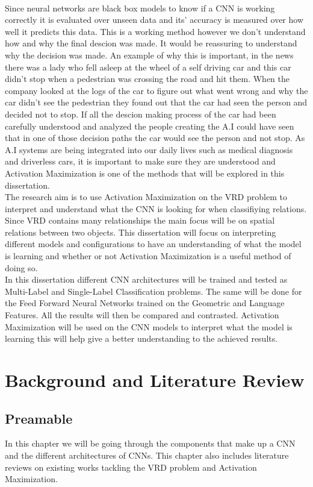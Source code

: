 \documentclass{csfyp}
\newcommand\tab[1][1cm]{\hspace*{#1}}
\begin{document}
\\
\tab
Since neural networks are black box models to know if a CNN is working correctly it is evaluated over unseen data and its’ accuracy is measured over how well it predicts this data. This is a working method however we don't understand how and why the final descion was made. It would be reassuring to understand why the decision was made. An example of why this is important, in the news there was a lady who fell asleep at the wheel of a self driving car and this car didn’t stop when a pedestrian was crossing the road and hit them. When the company looked at the logs of the car to figure out what went wrong and why the car didn’t see the pedestrian they found out that the car had seen the person and decided not to stop. If all the descion making process of the car had been carefully understood and analyzed the people creating the A.I could have seen that in one of those decision paths the car would see the person and not stop. As A.I systems are being integrated into our daily lives such as medical diagnosis and driverless cars, it is important to make sure they are understood and Activation Maximization is one of the methods that will be explored in this dissertation.
\\
\tab
The research aim is to use Activation Maximization on the VRD problem to interpret and understand what the CNN is looking for when classifiying relations. Since VRD contains many relationships the main focus will be on spatial relations between two objects. This dissertation will focus on interpreting different models and configurations to have an understanding of what the model is learning and whether or not Activation Maximization is a useful method of doing so.
\\
\tab In this dissertation different CNN architectures will be trained and tested as Multi-Label and Single-Label Classification problems. The same will be done for the Feed Forward Neural Networks trained on the Geometric and Language Features. All the results will then be compared and contrasted. Activation Maximization will be used on the CNN models to interpret what the model is learning this will help give a better understanding to the achieved results.

\section{Background and Literature Review}
\subsection{Preamable}
In this chapter we will be going through the components that make up a CNN and the different architectures of CNNs. This chapter also includes literature reviews on existing works tackling the VRD problem and Activation Maximization.
\end{document}
